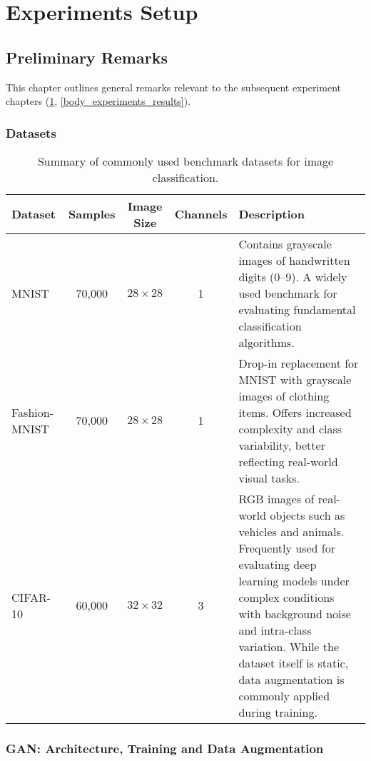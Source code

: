 \section{Experiments Setup}\label{body_experiments_setup}

\subsection{Preliminary Remarks}\label{body_prelim}
This chapter outlines general remarks relevant to the subsequent experiment chapters (\ref{body_experiments_setup}, \ref{body_experiments_results}).

\subsubsection{Datasets}

\begin{table}[H]
    \centering
    \caption{Summary of commonly used benchmark datasets for image classification.}
    \label{tab:dataset_summary}
    \begin{tabular}{|p{1.8cm}|c|c|c|p{6cm}|} %
        \hline
        \textbf{Dataset} & \textbf{Samples} & \textbf{Image Size} & \textbf{Channels} & \textbf{Description} \\
        \hline
        MNIST & 70,000 & $28 \times 28$ & 1 & Contains grayscale images of handwritten digits (0–9). A widely used benchmark for evaluating fundamental classification algorithms. \\
        \hline
        Fashion-MNIST & 70,000 & $28 \times 28$ & 1 & Drop-in replacement for MNIST with grayscale images of clothing items. Offers increased complexity and class variability, better reflecting real-world visual tasks. \\
        \hline
        CIFAR-10 & 60,000 & $32 \times 32$ & 3 & RGB images of real-world objects such as vehicles and animals. Frequently used for evaluating deep learning models under complex conditions with background noise and intra-class variation. While the dataset itself is static, data augmentation is commonly applied during training. \\
        \hline
    \end{tabular}
\end{table}



\subsubsection{GAN: Architecture, Training and Data Augmentation}

